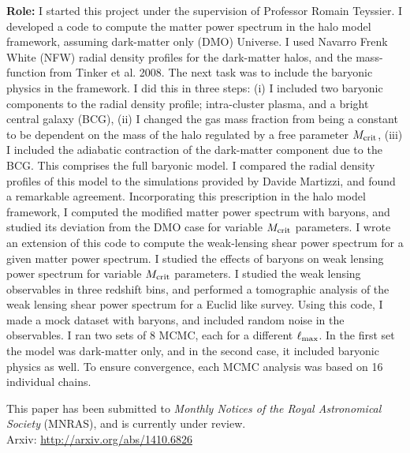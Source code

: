 {\bf Role:} I started this project under the supervision of Professor Romain Teyssier. 
I developed a code to compute the matter power spectrum
in the halo model framework, assuming dark-matter only (DMO) Universe. 
I used Navarro Frenk White (NFW) radial density profiles for the 
dark-matter halos, and the mass-function from 
Tinker et al. 2008. The next task was to include the baryonic
physics in the framework. 
I did this in three steps: (i) I included two baryonic components
to the radial density profile; intra-cluster plasma, 
and a bright central galaxy (BCG), (ii) I changed 
the gas mass fraction from being a constant to be dependent on the mass
of the halo regulated by a free parameter $M_{\rm crit}$, (iii)
I included the adiabatic contraction of the dark-matter component
due to the BCG. This comprises the full baryonic
model. I compared the radial density profiles of this model
to the simulations provided by Davide Martizzi, and found 
a remarkable agreement. 
Incorporating this prescription in the halo model framework, I computed
the modified matter power spectrum with baryons, and studied its
deviation from the DMO case for variable 
$M_{\rm crit}$ parameters.  
I wrote an extension of this code to compute the weak-lensing
shear power spectrum for a given matter power spectrum. I studied
the effects of baryons on weak lensing power spectrum
for variable $M_{\rm crit}$ parameters. I studied the weak lensing
observables in three redshift bins, and performed a tomographic 
analysis of the weak lensing shear power spectrum for a Euclid like
survey. Using this code, I made a mock dataset with baryons, and included
random noise in the observables.
I ran two sets of 8 MCMC, each for a different $\ell_{\rm max}$.
In the first
set the model was dark-matter only, and in the second case, it included
baryonic physics as well. 
To ensure convergence, each MCMC analysis was based on  
16 individual chains. 

This paper has been submitted to {\it Monthly Notices of the Royal Astronomical
Society} (MNRAS), and is currently under review.
\\
Arxiv: \url{http://arxiv.org/abs/1410.6826}

\clearpage
